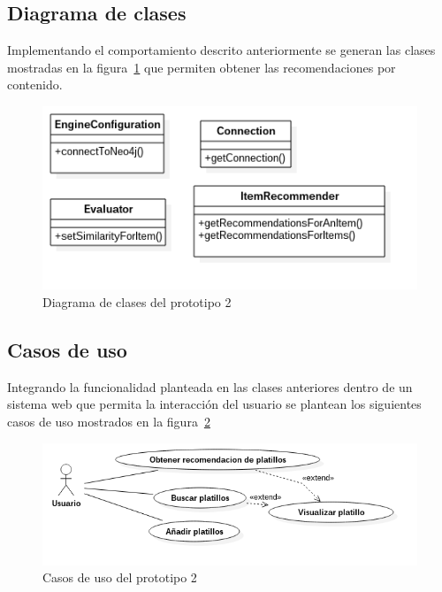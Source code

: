 \subsection{Diagrama de clases}
Implementando el comportamiento descrito anteriormente se generan las clases mostradas en la figura~\ref{fig: diagrama clases p2} que permiten obtener las recomendaciones por contenido. 
\begin{figure}[h!]
	\centering
	\includegraphics[width=12cm]{./images/p2_classes.png}
	\caption{Diagrama de clases del prototipo 2}
	\label{fig: diagrama clases p2}
\end{figure}

\subsection{Casos de uso}
Integrando la funcionalidad planteada en las clases anteriores dentro de un sistema web que permita la interacción del usuario se plantean los siguientes casos de uso mostrados en la figura~\ref{fig:CU p2}
\begin{figure}[h!]
	\centering
	\includegraphics[width=16cm]{./images/prototipo2.png}
	\caption{Casos de uso del prototipo 2}
	\label{fig:CU p2}
\end{figure}
    
